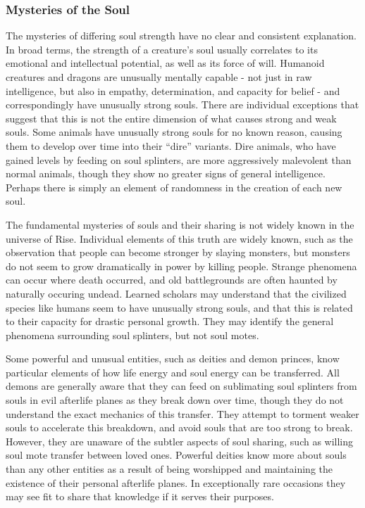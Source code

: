         \subsubsection{Mysteries of the Soul}
            The mysteries of differing soul strength have no clear and consistent explanation.
            In broad terms, the strength of a creature's soul usually correlates to its emotional and intellectual potential, as well as its force of will.
            Humanoid creatures and dragons are unusually mentally capable - not just in raw intelligence, but also in empathy, determination, and capacity for belief - and correspondingly have unusually strong souls.
            There are individual exceptions that suggest that this is not the entire dimension of what causes strong and weak souls.
            Some animals have unusually strong souls for no known reason, causing them to develop over time into their ``dire'' variants.
            Dire animals, who have gained levels by feeding on soul splinters, are more aggressively malevolent than normal animals, though they show no greater signs of general intelligence.
            Perhaps there is simply an element of randomness in the creation of each new soul.

            The fundamental mysteries of souls and their sharing is not widely known in the universe of Rise.
            Individual elements of this truth are widely known, such as the observation that people can become stronger by slaying monsters, but monsters do not seem to grow dramatically in power by killing people.
            Strange phenomena can occur where death occurred, and old battlegrounds are often haunted by naturally occuring undead.
            Learned scholars may understand that the civilized species like humans seem to have unusually strong souls, and that this is related to their capacity for drastic personal growth.
            They may identify the general phenomena surrounding soul splinters, but not soul motes.

            Some powerful and unusual entities, such as deities and demon princes, know particular elements of how life energy and soul energy can be transferred.
            All demons are generally aware that they can feed on sublimating soul splinters from souls in evil afterlife planes as they break down over time, though they do not understand the exact mechanics of this transfer.
            They attempt to torment weaker souls to accelerate this breakdown, and avoid souls that are too strong to break.
            However, they are unaware of the subtler aspects of soul sharing, such as willing soul mote transfer between loved ones.
            Powerful deities know more about souls than any other entities as a result of being worshipped and maintaining the existence of their personal afterlife planes.
            In exceptionally rare occasions they may see fit to share that knowledge if it serves their purposes.

